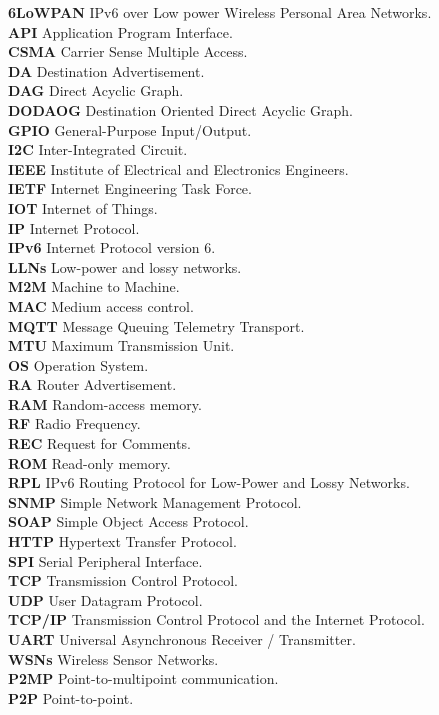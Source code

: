 \documentclass{report}
\begin{document}
\noindent
\textbf{6LoWPAN} IPv6 over Low power Wireless Personal Area Networks. \\
\textbf{API} Application Program Interface. \\
\textbf{CSMA} Carrier Sense Multiple Access. \\
\textbf{DA} Destination Advertisement.\\
\textbf{DAG} Direct Acyclic Graph.\\
\textbf{DODAOG} Destination Oriented Direct Acyclic Graph.\\
\textbf{GPIO} General-Purpose Input/Output.\\
\textbf{I2C} Inter-Integrated Circuit.\\
\textbf{IEEE} Institute of Electrical and Electronics Engineers.\\
\textbf{IETF} Internet Engineering Task Force.\\
\textbf{IOT} Internet of Things.\\
\textbf{IP} Internet Protocol.\\
\textbf{IPv6} Internet Protocol version 6.\\
\textbf{LLNs} Low-power and lossy networks.\\
\textbf{M2M} Machine to Machine.\\
\textbf{MAC} Medium access control.\\
\textbf{MQTT} Message Queuing Telemetry Transport.\\
\textbf{MTU} Maximum Transmission Unit.\\
\textbf{OS} Operation System.\\
\textbf{RA} Router Advertisement.\\
\textbf{RAM} Random-access memory.\\
\textbf{RF} Radio Frequency.\\
\textbf{REC} Request for Comments.\\
\textbf{ROM} Read-only memory.\\
\textbf{RPL} IPv6 Routing Protocol for Low-Power and Lossy Networks.\\
\textbf{SNMP} Simple Network Management Protocol.\\
\textbf{SOAP} Simple Object Access Protocol.\\
\textbf{HTTP} Hypertext Transfer Protocol.\\
\textbf{SPI} Serial Peripheral Interface.\\
\textbf{TCP} Transmission Control Protocol.\\
\textbf{UDP} User Datagram Protocol.\\
\textbf{TCP/IP} Transmission Control Protocol and the Internet Protocol.\\
\textbf{UART} Universal Asynchronous Receiver / Transmitter.\\
\textbf{WSNs} Wireless Sensor Networks. \\
\textbf{P2MP} Point-to-multipoint communication. \\
\textbf{P2P} Point-to-point.
\end{document}
